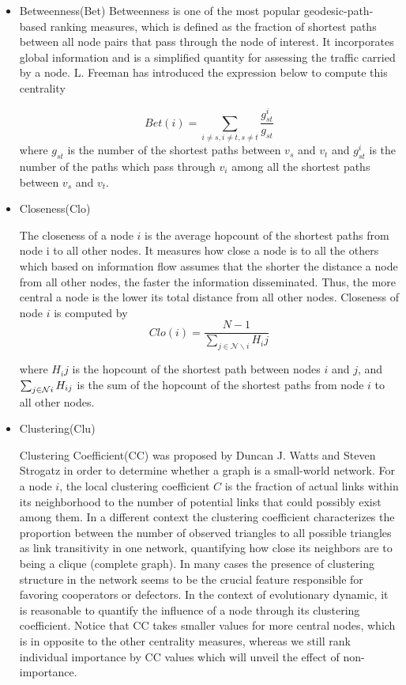 \documentclass[preprint,12pt,3p]{elsarticle}
\begin{document}
\begin{itemize}
\item Betweenness(Bet)
Betweenness \cite{Anthonisse-18331} is one of the most popular geodesic-path-based ranking measures,
which is defined as the fraction of shortest paths between all node pairs that
pass through the node of interest.
It incorporates global information and is a simplified quantity for assessing the traffic carried by a
node.
L. Freeman \cite{Freeman-18315} has introduced the expression below to compute this centrality

\begin{equation}\label{Betweenness}
Bet(i)=\sum_{i\neq s,i\neq t,s\neq t}{\frac{g^i_{st}}{g_{st}}}
\end{equation}
where $g_{st}$ is the number of the shortest paths between $v_s$ and $v_t$
and $g^i_{st}$ is the number of the paths which pass through $v_i$
among all the shortest paths between $v_s$ and $v_t$.

\item Closeness(Clo)

The closeness \cite{KoschützkiLehmann-18332} of a node $i$ is the average hopcount
of the shortest paths from node i to all other nodes.
It measures how close a node is to all the others which based on information flow assumes that the shorter the distance a node from all other nodes, the faster the information disseminated.
Thus, the more central a node is the lower its total distance from all other nodes.
Closeness of node $i$ is computed by
\begin{equation}\label{closeness}
Clo(i)=\frac{N-1}{\sum_{j\in\mathcal{N}\backslash{i}}{H_ij}}
\end{equation}

where $H_ij$ is the hopcount of the shortest path between nodes $i$ and $j$,
and $\sum_{j\in\mathcal{N}\\{i}}{H_{ij}}$ is the sum of the hopcount of the shortest paths from
node $i$ to all other nodes.

\item Clustering(Clu)

Clustering Coefficient(CC) was proposed by Duncan J. Watts and Steven Strogatz \cite{WattsStrogatz-18333} in order to determine whether a graph is a small-world network.
For a node $i$, the local clustering coefficient $C$ is the fraction of actual links within its neighborhood to the number of potential links that could possibly exist among them.
In a different context the clustering coefficient characterizes the proportion between the number of observed triangles to all possible triangles as link transitivity in one network, quantifying how close its neighbors are to being a clique (complete graph).
In many cases the presence of clustering structure in the network seems to be the crucial feature responsible for favoring cooperators or defectors\cite{SantosPacheco-18280,HuangZheng-18221}.
In the context of evolutionary dynamic, it is reasonable to quantify the influence of a node through its clustering coefficient.
Notice that CC takes smaller values for more central nodes, which is in opposite to the other centrality measures, whereas we still rank individual importance by CC values which will unveil the effect of non-importance.


\end{itemize}
\end{document}
